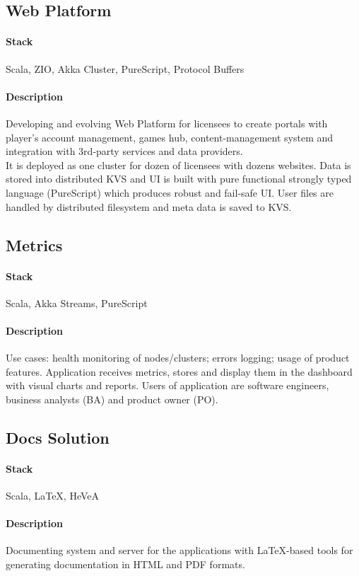 \subsection{Web Platform}
\paragraph{Stack} Scala, ZIO, Akka Cluster, PureScript, Protocol Buffers
\paragraph{Description}
Developing and evolving Web Platform for licensees to create portals with player's account management, games hub, content-management system and integration with 3rd-party services and data providers.\\
It is deployed as one cluster for dozen of licensees with dozens websites. Data is stored into distributed KVS and UI is built with pure functional strongly typed language (PureScript) which produces robust and fail-safe UI. User files are handled by distributed filesystem and meta data is saved to KVS.

\subsection{Metrics}
\paragraph{Stack} Scala, Akka Streams, PureScript
\paragraph{Description}
Use cases: health monitoring of nodes/clusters; errors logging; usage of product features. Application receives metrics, stores and display them in the dashboard with visual charts and reports. Users of application are software engineers, business analysts (BA) and product owner (PO).

\subsection{Docs Solution}
\paragraph{Stack} Scala, LaTeX, HeVeA
\paragraph{Description}
Documenting system and server for the applications with LaTeX-based tools for generating documentation in HTML and PDF formats.

